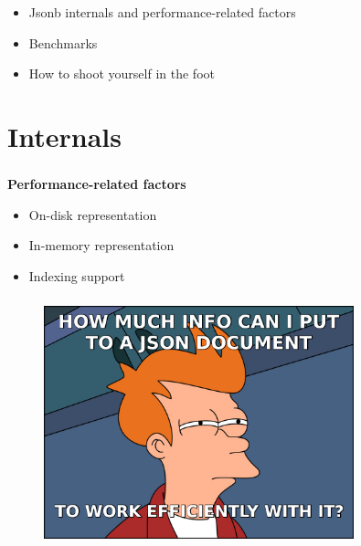 \documentclass[usenames,dvipsnames, 18pt, compress, aspectratio=169]{beamer}
\begin{document}
\begin{frame}
    \frametitle{}
    \begin{center}
        \pause
        \begin{itemize}[label={\MVRightarrow}]
            \item <+-> Jsonb internals and performance-related factors
            \item <+-> Benchmarks
            \item <+-> How to shoot yourself in the foot
        \end{itemize}
    \end{center}
\end{frame}

\fontsize{13pt}{14}\selectfont
\section{Internals}
\fontsize{17pt}{18}\selectfont

\begin{frame}
    \frametitle{}
    \begin{center}
        \textbf{Performance-related factors}
        \pause
        \begin{itemize}[label={\MVRightarrow}]
            \item <+-> On-disk representation
            \item <+-> In-memory representation
            \item <+-> Indexing support
        \end{itemize}
    \end{center}
\end{frame}

\fontsize{17pt}{19}\selectfont
\begin{frame}
    \frametitle{}
    \begin{center}

    \begin{figure}
        \includegraphics[width=0.8\textwidth,center]{fry_disk_json2.jpg}
    \end{figure}

    \end{center}
\end{frame}
\end{document}
